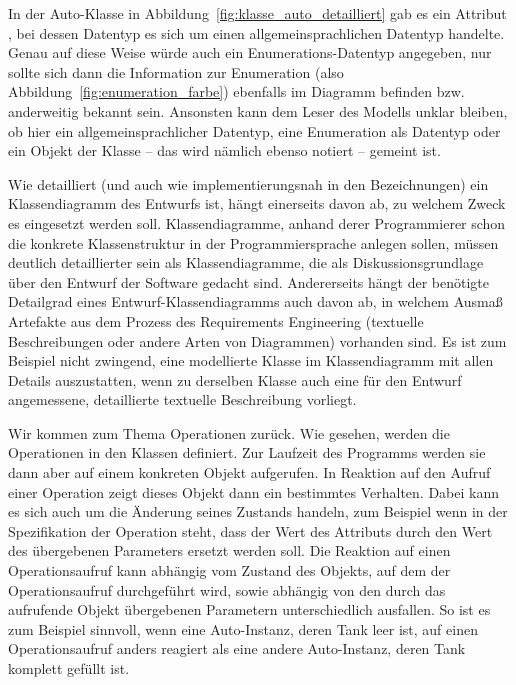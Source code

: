 \vspace{2.5mm} %

In der Auto-Klasse in Abbildung~\ref{fig:klasse_auto_detailliert} gab es ein Attribut , bei dessen Datentyp  es sich um einen allgemeinsprachlichen Datentyp handelte. Genau auf diese Weise würde auch ein Enumerations-Datentyp angegeben, nur sollte sich dann die Information zur Enumeration (also Abbildung~\ref{fig:enumeration_farbe}) ebenfalls im Diagramm befinden bzw. anderweitig bekannt sein. Ansonsten kann dem Leser des Modells unklar bleiben, ob hier ein allgemeinsprachlicher Datentyp, eine Enumeration als Datentyp oder ein Objekt der Klasse  -- das wird nämlich ebenso notiert -- gemeint ist.

\vspace{2.5mm} %

Wie detailliert (und auch wie implementierungsnah in den Bezeichnungen) ein 
\linebreak %
Klassendiagramm des Entwurfs ist, hängt einerseits davon ab, zu welchem Zweck es eingesetzt werden soll. Klassendiagramme, anhand derer Programmierer schon die konkrete Klassenstruktur in der Programmiersprache anlegen sollen, müssen deutlich detaillierter sein als Klassendiagramme, die als Diskussionsgrundlage über den Entwurf der Software gedacht sind. Andererseits hängt der benötigte Detailgrad \mbox{eines} Entwurf-Klassendiagramms auch davon ab, in welchem Ausmaß Artefakte aus dem Prozess des Requirements Engineering (textuelle Beschreibungen oder andere Arten von Diagrammen) vorhanden sind. Es ist zum Beispiel nicht zwingend, eine modellierte Klasse im Klassendiagramm mit allen Details auszustatten, wenn zu derselben Klasse auch eine für den Entwurf angemessene, detaillierte textuelle Beschreibung vorliegt.

\vspace{2.5mm} %

Wir kommen zum Thema Operationen zurück. Wie gesehen, werden die Opera\-tionen in den Klassen definiert. Zur Laufzeit des Programms werden sie dann aber auf \mbox{einem} konkreten Objekt aufgerufen. In Reaktion auf den Aufruf einer Operation zeigt dieses Objekt dann ein bestimmtes Verhalten. Dabei kann es sich auch um die Änderung seines Zustands handeln, zum Beispiel wenn in der Spezi\-fika\-tion der Operation  steht, dass der Wert des Attributs  durch den Wert des übergebenen Parameters  ersetzt werden soll. Die Reaktion auf einen Operations\-aufruf kann abhängig vom Zustand des Objekts, auf dem der Operationsaufruf durchgeführt wird, sowie abhängig von den durch das aufrufende Objekt übergebenen Parametern unterschiedlich ausfallen. So ist es zum Beispiel sinnvoll, wenn eine Auto-Instanz, deren Tank leer ist, auf einen Operationsaufruf  anders reagiert als eine andere Auto-Instanz, deren Tank komplett gefüllt ist. 

